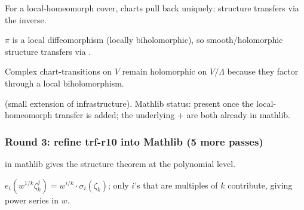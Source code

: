 \begin{lemma}
\label{lem:ctp-r12}
For a local-homeomorph cover, charts pull back uniquely;  structure transfers via the inverse.
\leanok\mathlibok
\end{lemma}

\begin{lemma}
\label{lem:ctp-r13}
$\pi$ is a local diffeomorphism (locally biholomorphic), so smooth/holomorphic structure transfers via .
\leanok\mathlibok
\end{lemma}

\begin{lemma}
\label{lem:ctp-r14}
Complex chart-transitions on $V$ remain holomorphic on $V/\Lambda$ because they factor through a local biholomorphism.
\leanok
\end{lemma}

\begin{lemma}
\label{lem:ctp-r15}
 (small extension of  infrastructure).  Mathlib status: present once the local-homeomorph transfer is added; the underlying  +  are both already in mathlib.
\leanok\mathlibok
\end{lemma}

\subsubsection*{Round 3: refine trf-r10 into Mathlib (5 more passes)}

\begin{lemma}[Pass trf.11: symmetric polynomial in $k$ roots = polynomial in $e_{1},\ldots,e_{k}$]
\label{lem:trf-r11}
 in mathlib gives the structure theorem at the polynomial level.
\leanok\mathlibok
\end{lemma}

\begin{lemma}
\label{lem:trf-r12}
$e_{i}(w^{1/k}\zeta_{k}^{j}) = w^{i/k}\cdot\sigma_{i}(\zeta_{k})$; only $i$'s that are multiples of $k$ contribute, giving power series in $w$.
\leanok
\end{lemma}

